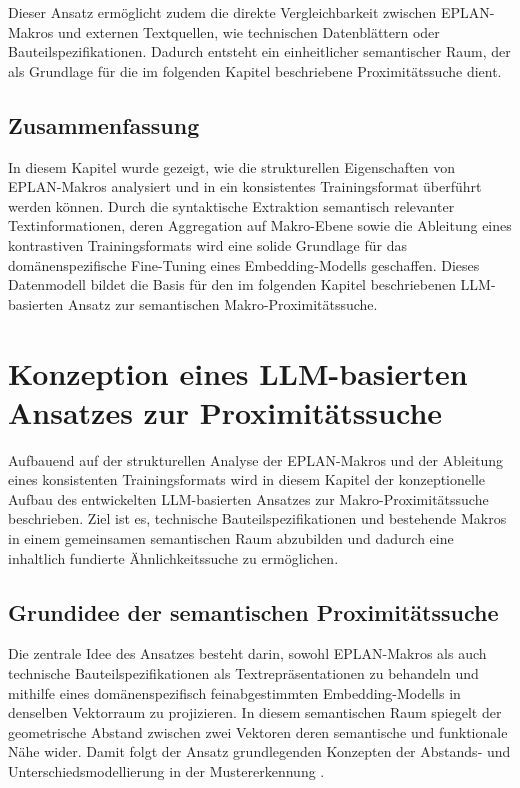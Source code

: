 Dieser Ansatz ermöglicht zudem die direkte Vergleichbarkeit zwischen EPLAN-Makros und externen Textquellen, wie technischen Datenblättern oder Bauteilspezifikationen. Dadurch entsteht ein einheitlicher semantischer Raum, der als Grundlage für die im folgenden Kapitel beschriebene Proximitätssuche dient.

\section{Zusammenfassung}

In diesem Kapitel wurde gezeigt, wie die strukturellen Eigenschaften von EPLAN-Makros analysiert und in ein konsistentes Trainingsformat überführt werden können. Durch die syntaktische Extraktion semantisch relevanter Textinformationen, deren Aggregation auf Makro-Ebene sowie die Ableitung eines kontrastiven Trainingsformats wird eine solide Grundlage für das domänenspezifische Fine-Tuning eines Embedding-Modells geschaffen. Dieses Datenmodell bildet die Basis für den im folgenden Kapitel beschriebenen LLM-basierten Ansatz zur semantischen Makro-Proximitätssuche.





\chapter{Konzeption eines LLM-basierten Ansatzes zur Proximitätssuche}

Aufbauend auf der strukturellen Analyse der EPLAN-Makros und der Ableitung eines konsistenten Trainingsformats wird in diesem Kapitel der konzeptionelle Aufbau des entwickelten LLM-basierten Ansatzes zur Makro-Proximitätssuche beschrieben. Ziel ist es, technische Bauteilspezifikationen und bestehende Makros in einem gemeinsamen semantischen Raum abzubilden und dadurch eine inhaltlich fundierte Ähnlichkeitssuche zu ermöglichen.

\section{Grundidee der semantischen Proximitätssuche}

Die zentrale Idee des Ansatzes besteht darin, sowohl EPLAN-Makros als auch technische Bauteilspezifikationen als Textrepräsentationen zu behandeln und mithilfe eines domänenspezifisch feinabgestimmten Embedding-Modells in denselben Vektorraum zu projizieren. In diesem semantischen Raum spiegelt der geometrische Abstand zwischen zwei Vektoren deren semantische und funktionale Nähe wider. Damit folgt der Ansatz grundlegenden Konzepten der Abstands‑ und Unterschiedsmodellierung in der Mustererkennung \cite{gower,rogers}.

